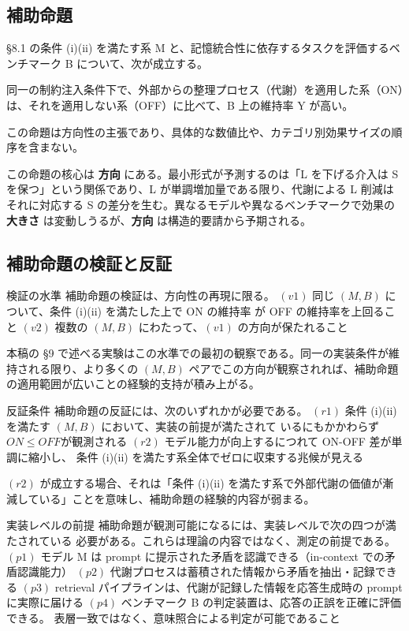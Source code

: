 \documentclass[12pt,a4paper]{article}
\begin{document}
\subsection{補助命題}\label{ux88dcux52a9ux547dux984c}

\begin{lemma}[補助命題]
§8.1 の条件 (i)(ii) を満たす系 M と、記憶統合性に依存するタスクを評価するベンチマーク B について、次が成立する。

同一の制約注入条件下で、外部からの整理プロセス（代謝）を適用した系（ON）は、それを適用しない系（OFF）に比べて、B 上の維持率 Y が高い。

この命題は方向性の主張であり、具体的な数値比や、カテゴリ別効果サイズの順序を含まない。
\end{lemma}

この命題の核心は \textbf{方向} にある。最小形式が予測するのは「L を下げる介入は S を保つ」という関係であり、L が単調増加量である限り、代謝による L 削減はそれに対応する S の差分を生む。異なるモデルや異なるベンチマークで効果の \textbf{大きさ} は変動しうるが、\textbf{方向} は構造的要請から予期される。

\subsection{補助命題の検証と反証}\label{ux88dcux52a9ux547dux984cux306eux691cux8a3cux3068ux53cdux8a3c}

検証の水準 補助命題の検証は、方向性の再現に限る。 \((v1)\) 同じ \((M, B)\) について、条件 (i)(ii) を満たした上で ON の維持率 が OFF の維持率を上回ること \((v2)\) 複数の \((M, B)\) にわたって、\((v1)\) の方向が保たれること

本稿の §9 で述べる実験はこの水準での最初の観察である。同一の実装条件が維持される限り、より多くの \((M, B)\) ペアでこの方向が観察されれば、補助命題の適用範囲が広いことの経験的支持が積み上がる。

反証条件 補助命題の反証には、次のいずれかが必要である。 \((r1)\) 条件 (i)(ii) を満たす \((M, B)\) において、実装の前提が満たされて いるにもかかわらず \(ON \le OFF\)が観測される \((r2)\) モデル能力が向上するにつれて ON-OFF 差が単調に縮小し、 条件 (i)(ii) を満たす系全体でゼロに収束する兆候が見える

\((r2)\) が成立する場合、それは「条件 (i)(ii) を満たす系で外部代謝の価値が漸減している」ことを意味し、補助命題の経験的内容が弱まる。

実装レベルの前提 補助命題が観測可能になるには、実装レベルで次の四つが満たされている 必要がある。これらは理論の内容ではなく、測定の前提である。 \((p1)\) モデル M は prompt に提示された矛盾を認識できる（in-context での矛盾認識能力） \((p2)\) 代謝プロセスは蓄積された情報から矛盾を抽出・記録できる \((p3)\) retrieval パイプラインは、代謝が記録した情報を応答生成時の prompt に実際に届ける \((p4)\) ベンチマーク B の判定装置は、応答の正誤を正確に評価できる。 表層一致ではなく、意味照合による判定が可能であること
\end{document}
